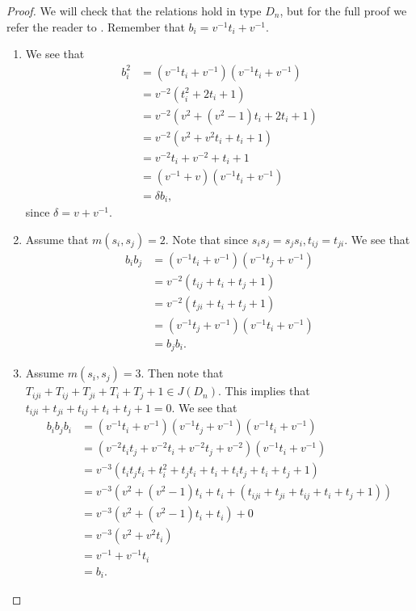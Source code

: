 \begin{proof}
We will check that the relations hold in type $D_n$, but for the full proof we refer the reader to \cite[Proposition~2.6]{Green2006a}. Remember that $b_{i}=v^{-1}t_{i}+v^{-1}$.
\begin{enumerate}[leftmargin=0.6in] \item We see that
\begin{align*}
b_{i}^{2} &= \left(v^{-1}t_{i}+v^{-1}\right)\left(v^{-1}t_{i}+v^{-1}\right)\\
&= v^{-2}\left(t_{i}^{2}+2t_{i}+1\right)\\
&= v^{-2}\left(v^{2}+\left(v^{2}-1\right)t_{i}+2t_{i}+1\right)\\
&= v^{-2}\left(v^{2}+v^{2}t_{i}+t_{i}+1\right)\\
&= v^{-2}t_{i}+v^{-2}+t_{i}+1\\
&= \left(v^{-1}+v\right)\left(v^{-1}t_{i}+v^{-1}\right)\\
&=\delta b_{i},
\end{align*}
\indent since $\delta=v+v^{-1}$.
\item Assume that $m(s_i,s_j)=2$. Note that since $s_is_j=s_js_i, t_{ij}=t_{ji}.$ We see that
\begin{align*}
b_{i}b_{j} &= \left(v^{-1}t_{i}+v^{-1}\right)\left(v^{-1}t_{j}+v^{-1}\right)\\
&= v^{-2}\left(t_{ij}+t_{i}+t_{j}+1\right)\\
&= v^{-2}\left(t_{ji}+t_{i}+t_{j}+1\right)\\
&= \left(v^{-1}t_{j}+v^{-1}\right)\left(v^{-1}t_{i}+v^{-1}\right)\\
&= b_{j}b_{i}.
\end{align*}
\item Assume $m(s_i,s_j)=3$. Then note that $T_{iji}+T_{ij}+T_{ji}+T_i+T_j+1\in J(D_n)$. This implies that $t_{iji}+t_{ji}+t_{ij}+t_{i}+t_{j}+1=0$. We see that
 \begin{align*}
b_{i}b_{j}b_{i} &= \left(v^{-1}t_{i}+v^{-1}\right)\left(v^{-1}t_{j}+v^{-1}\right)\left(v^{-1}t_{i}+v^{-1}\right)\\
&= \left(v^{-2}t_{i}t_{j}+v^{-2}t_{i}+v^{-2}t_{j}+v^{-2}\right)\left(v^{-1}t_{i}+v^{-1}\right)\\
&= v^{-3}\left(t_{i}t_{j}t_{i}+t_{i}^{2}+t_{j}t_{i}+t_{i}+t_{i}t_{j}+t_{i}+t_{j}+1\right)\\
&= v^{-3}\left(v^{2}+\left(v^{2}-1\right)t_{i}+t_{i}+\left(t_{iji}+t_{ji}+t_{ij}+t_{i}+t_{j}+1\right)\right)\\
&= v^{-3}\left(v^{2}+\left(v^{2}-1\right)t_{i}+t_{i}\right)+0\\
&= v^{-3}\left(v^{2}+v^{2}t_{i}\right)\\
&= v^{-1}+v^{-1}t_{i}\\
&= b_{i}.
\end{align*}
\end{enumerate}
\end{proof}

